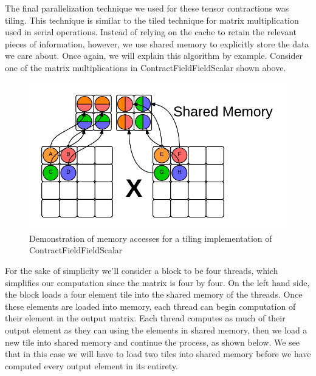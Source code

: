 The final parallelization technique we used for these tensor contractions was
tiling. This technique is similar to the tiled technique for matrix
multiplication used in serial operations. Instead of relying on the cache to
retain the relevant pieces of information, however, we use shared memory to
explicitly store the data we care about. Once again, we will explain this
algorithm by example. Consider one of the matrix multiplications in
ContractFieldFieldScalar shown above. 

\begin{figure}
    \centering
    \includegraphics[scale = .7]{ContractFieldFieldScalarGraphicTiling}
    \caption{Demonstration of memory accesses for a tiling implementation of ContractFieldFieldScalar}
\end{figure}

For the sake of simplicity we'll consider a block to be four threads, which
simplifies our computation since the matrix is four by four. On the left hand
side, the block loads a four element tile into the shared memory of the
threads. Once these elements are loaded into memory, each thread can begin
computation of their element in the output matrix. Each thread computes as much
of their output element as they can using the elements in shared memory, then
we load a new tile into shared memory and continue the process, as shown below.
We see that in this case we will have to load two tiles into shared memory
before we have computed every output element in its entirety. 

